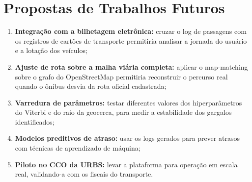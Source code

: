 \section{Propostas de Trabalhos Futuros}\label{sec:trabalhosFuturos}

\begin{enumerate}
  \item \textbf{Integração com a bilhetagem eletrônica:} cruzar o log de passagens com os registros de cartões de transporte permitiria analisar a jornada do usuário e a lotação dos veículos;
  \item \textbf{Ajuste de rota sobre a malha viária completa:} aplicar o map-matching sobre o grafo do OpenStreetMap permitiria reconstruir o percurso real quando o ônibus desvia da rota oficial cadastrada;
  \item \textbf{Varredura de parâmetros:} testar diferentes valores dos hiperparâmetros do Viterbi e do raio da geocerca, para medir a estabilidade dos gargalos identificados;
  \item \textbf{Modelos preditivos de atraso:} usar os logs gerados para prever atrasos com técnicas de aprendizado de máquina;
  \item \textbf{Piloto no CCO da URBS:} levar a plataforma para operação em escala real, validando-a com os fiscais do transporte.
\end{enumerate}
